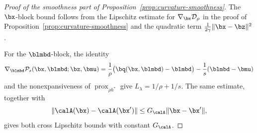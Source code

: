\begin{proof}[Proof of the smoothness part of Proposition~\ref{prop:curvature-smoothness}]
The $\bx$-block bound follows from the Lipschitz estimate for
$\nabla_{\bx}\mathcal D_\rho$ in the proof of
Proposition~\ref{prop:curvature-smoothness} and the quadratic term
$\frac{1}{2\gamma}\|\bx-\bz\|^2$.

For the $\blmbd$-block, the identity
\[
    \nabla_{\blmbd}\mathcal P_s(\bx,\blmbd;\bz,\bmu)
    =
    \frac{1}{\rho}
    \bigl(\bq(\bx,\blmbd)-\blmbd\bigr)
    -\frac{1}{s}(\blmbd-\bmu)
\]
and the nonexpansiveness of
$\operatorname{prox}_{\rho h^*}$ give
$L_\lambda=1/\rho+1/s$.
The same estimate, together with
\[
    \|\calA(\bx)-\calA(\bx')\|
    \le G_{\calA}\|\bx-\bx'\|,
\]
gives both cross Lipschitz bounds with constant $G_{\calA}$.
\end{proof}

